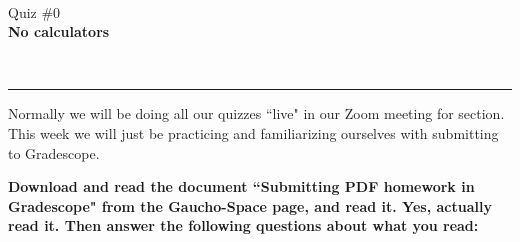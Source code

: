 \documentclass[12pt]{article}
\newcommand{\version}{}
\newcommand{\xzero}{}
\newcommand{\xone}{}
\newcommand{\xtwo}{}
\newcommand{\xthree}{}
\newcommand{\xfour}{}
\newcommand{\xfive}{}
\newcommand{\ExamName}{Quiz \#0\version}
\begin{document}
\renewcommand{\version}{}
\renewcommand{\xzero}{0.0}
\renewcommand{\xone}{1.3}
\renewcommand{\xtwo}{2.9}
\renewcommand{\xthree}{4.1}
\renewcommand{\xfour}{5.3}
\renewcommand{\xfive}{6.5}
% 
\begin{minipage}{0.25\linewidth}
  \CourseName\ \Quarter \\
  \ExamName \\[1em]
  \textbf{No calculators}\\[2em]
\end{minipage}
\hfill
\begin{minipage}[t]{0.4\linewidth}
\end{minipage}
\hfill
\begin{minipage}{0.25\linewidth}
  \vspace*{-3.25em}
  \ \hfill
\end{minipage}
\vspace*{-0.25in}

\hfill
\begin{minipage}{0.5\linewidth}

\end{minipage}
\noindent\hspace*{-2em}\rule{\textwidth+4em}{1pt}%

\mbox{}

Normally we will be doing all our quizzes ``live" in our Zoom meeting for section. This week we will just be practicing and familiarizing ourselves with submitting to Gradescope.

\mbox{}

\textbf{Download and read the document ``Submitting PDF homework in Gradescope" from the Gaucho-Space page, and read it. Yes, actually read it. Then answer the following questions about what you read: }
\end{document}
